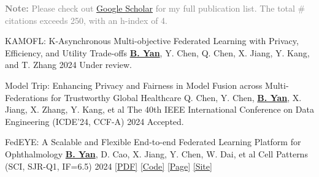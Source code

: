 
\begin{cvparagraph}
\textcolor{gray}{\textbf{Note:} Please check out \href{https://scholar.google.com/citations?hl=en&user=DVsgN1sAAAAJ}{Google Scholar} for my full publication list.
The total \# citations exceeds 250, with an h-index of 4.}
\end{cvparagraph}

\begin{cvpublications}

\cvpublication
{KAMOFL: K-Asynchronous Multi-objective Federated Learning with Privacy, Efficiency, and Utility Trade-offs} %
{\underline{\textbf{B. Yan}}, Y. Chen, Q. Chen, X. Jiang, Y. Kang, and T. Zhang} %
{} %
{2024} %
{Under review.} %






\cvpublication
{Model Trip: Enhancing Privacy and Fairness in Model Fusion across Multi-Federations for Trustworthy Global Healthcare} %
{Q. Chen, Y. Chen, \underline{\textbf{B. Yan}}, X. Jiang, X. Zhang, Y. Kang, et al} %
{The 40th IEEE International Conference on Data Engineering (ICDE'24, CCF-A)} %
{2024} %
{Accepted.} %


\cvpublication
{FedEYE: A Scalable and Flexible End-to-end Federated Learning Platform for Ophthalmology} %
{\underline{\textbf{B. Yan}}, D. Cao, X. Jiang, Y. Chen, W. Dai, et al} %
{Cell Patterns (SCI, SJR-Q1, IF=6.5)} %
{2024} %
{\href{https://www.cell.com/patterns/fulltext/S2666-3899(24)00019-9}{[PDF]} \href{https://github.com/beiyuouo/FedEYE}{[Code]} \href{https://www.bj-yan.top/FedEYE/}{[Page]} \href{https://fedeye.aierchina.com/}{[Site]}} %


\end{cvpublications}

